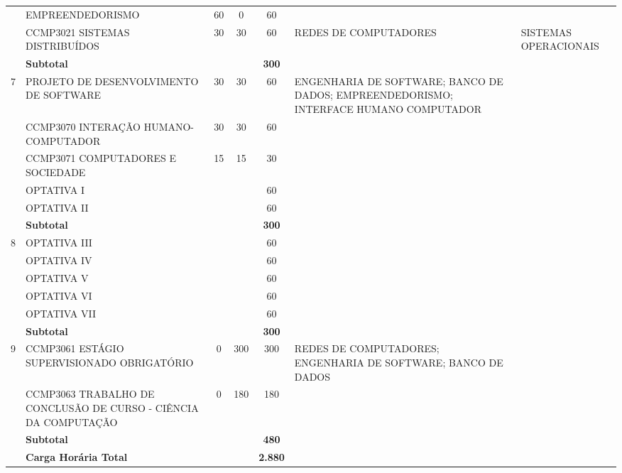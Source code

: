 \documentclass[
	12pt,				%
	openright,			%
  oneside,     %
	a4paper,			%
	chapter=TITLE,		%
	english,			%
	french,				%
	spanish,			%
	brazil				%
	]{abntex2}
\begin{document}
\begin{center}
\begin{tiny}
\begin{longtable}{cp{4.5cm}cccp{2.8cm}p{2.8cm}}
        & EMPREENDEDORISMO & 60 & 0 & 60 & & \\ \cline{2-7}
        & CCMP3021 SISTEMAS DISTRIBUÍDOS & 30 & 30 & 60 & REDES DE COMPUTADORES & SISTEMAS OPERACIONAIS \\ \midrule 
        & \multicolumn{3}{l}{\textbf{Subtotal}} & \textbf{300} & & \\ \midrule
    7 
        & PROJETO DE DESENVOLVIMENTO DE SOFTWARE & 30 & 30 & 60 & ENGENHARIA DE SOFTWARE; \newline BANCO DE DADOS; \newline EMPREENDEDORISMO; \newline INTERFACE HUMANO COMPUTADOR & \\ \cline{2-7}
        & CCMP3070 INTERAÇÃO HU\-MA\-NO-COM\-PU\-TA\-DOR & 30 & 30 & 60 & & \\ \cline{2-7}
        & CCMP3071 COMPUTADORES E SOCIEDADE & 15 & 15 & 30  & &\\ \cline{2-7}
        & OPTATIVA I & & & 60 & & \\ \cline{2-7}
        & OPTATIVA II & & & 60 & & \\ \midrule
        & \multicolumn{3}{l}{\textbf{Subtotal}} & \textbf{300} & & \\ \midrule
    8
        & OPTATIVA III & & & 60 & & \\ \cline{2-7}
        & OPTATIVA IV & & & 60 & & \\ \cline{2-7}
        & OPTATIVA V & & & 60 & & \\ \cline{2-7}
        & OPTATIVA VI & & & 60 & & \\ \cline{2-7}
        & OPTATIVA VII & & & 60 & & \\ \midrule
        & \multicolumn{3}{l}{\textbf{Subtotal}} & \textbf{300} & & \\ \midrule
    9   
        & CCMP3061 ESTÁGIO SUPERVISIONADO OBRIGATÓRIO & 0 & 300 & 300 & REDES DE COMPUTADORES; \newline ENGENHARIA DE SOFTWARE; \newline BANCO DE DADOS & \\ \cline{2-7}
        & CCMP3063 TRABALHO DE CONCLUSÃO DE CURSO - CIÊNCIA DA COMPUTAÇÃO & 0 & 180 & 180 & & \\ \midrule
        & \multicolumn{3}{l}{\textbf{Subtotal}} & \textbf{480} & & \\ \midrule
        & \multicolumn{3}{l}{\textbf{Carga Horária Total}} & \textbf{2.880} & & \\
      \bottomrule
  \end{longtable}
  \end{tiny}      
  \end{center}
  
\end{document}
